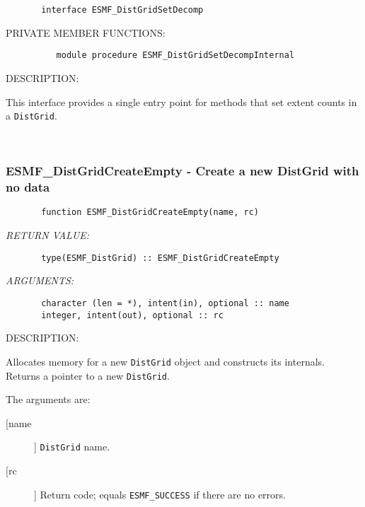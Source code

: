\begin{verbatim}       interface ESMF_DistGridSetDecomp
 \end{verbatim}{\sf PRIVATE MEMBER FUNCTIONS:}
\begin{verbatim}          module procedure ESMF_DistGridSetDecompInternal
 \end{verbatim}
{\sf DESCRIPTION:\\ }


       This interface provides a single entry point for methods that set
       extent counts in a {\tt DistGrid}.
   
 
\mbox{}\hrulefill\ 
 
\subsubsection{ESMF\_DistGridCreateEmpty - Create a new DistGrid with no data}


 
\begin{verbatim}       function ESMF_DistGridCreateEmpty(name, rc)\end{verbatim}{\em RETURN VALUE:}
\begin{verbatim}       type(ESMF_DistGrid) :: ESMF_DistGridCreateEmpty\end{verbatim}{\em ARGUMENTS:}
\begin{verbatim}       character (len = *), intent(in), optional :: name  
       integer, intent(out), optional :: rc               
 \end{verbatim}
{\sf DESCRIPTION:\\ }


       Allocates memory for a new {\tt DistGrid} object and constructs its
       internals.  Returns a pointer to a new {\tt DistGrid}.
  
       The arguments are:
       \begin{description}
       \item[[name]] 
            {\tt DistGrid} name.
       \item[[rc]] 
            Return code; equals {\tt ESMF\_SUCCESS} if there are no errors.
     \end{description}
  
\begin{verbatim} \end{verbatim}
 
